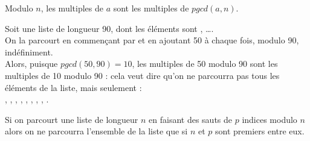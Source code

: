 \documentclass[a4paper,12pt,french]{book}
\begin{document}
\begin{propriete}[]
	Modulo $n$, les multiples de $a$ sont les multiples de $pgcd(a,n)$.
\end{propriete}

\begin{methode}[]
	Soit une liste  de longueur 90, dont les éléments sont ,  \ldots {}.\\
	On la parcourt en commençant par  et en ajoutant 50 à chaque fois, modulo 90, indéfiniment.\\
	Alors, puisque $pgcd(50,90)=10$, les multiples de 50 modulo 90 sont les multiples de 10 modulo 90 : cela veut dire qu'on ne parcourra pas tous les éléments de la liste, mais seulement :\\
	 , , , , , , ,  , .  	
\end{methode}

\begin{remarque}[]
	Si on parcourt une liste de longueur $n$ en faisant des \og sauts de $p$ indices modulo $n$\fg{} alors on ne parcourra l'ensemble de la liste que si $n$ et $p$ sont premiers entre eux.
\end{remarque}
\end{document}
